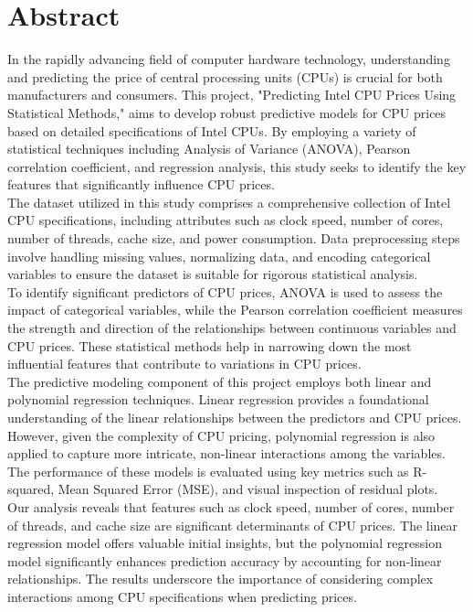 \section{Abstract}

In the rapidly advancing field of computer hardware technology, understanding and predicting the price of central processing units (CPUs) is crucial for both manufacturers and consumers. This project, "Predicting Intel CPU Prices Using Statistical Methods," aims to develop robust predictive models for CPU prices based on detailed specifications of Intel CPUs. By employing a variety of statistical techniques including Analysis of Variance (ANOVA), Pearson correlation coefficient, and regression analysis, this study seeks to identify the key features that significantly influence CPU prices.\\

The dataset utilized in this study comprises a comprehensive collection of Intel CPU specifications, including attributes such as clock speed, number of cores, number of threads, cache size, and power consumption. Data preprocessing steps involve handling missing values, normalizing data, and encoding categorical variables to ensure the dataset is suitable for rigorous statistical analysis.\\

To identify significant predictors of CPU prices, ANOVA is used to assess the impact of categorical variables, while the Pearson correlation coefficient measures the strength and direction of the relationships between continuous variables and CPU prices. These statistical methods help in narrowing down the most influential features that contribute to variations in CPU prices.\\

The predictive modeling component of this project employs both linear and polynomial regression techniques. Linear regression provides a foundational understanding of the linear relationships between the predictors and CPU prices. However, given the complexity of CPU pricing, polynomial regression is also applied to capture more intricate, non-linear interactions among the variables. The performance of these models is evaluated using key metrics such as R-squared, Mean Squared Error (MSE), and visual inspection of residual plots.\\

Our analysis reveals that features such as clock speed, number of cores, number of threads, and cache size are significant determinants of CPU prices. The linear regression model offers valuable initial insights, but the polynomial regression model significantly enhances prediction accuracy by accounting for non-linear relationships. The results underscore the importance of considering complex interactions among CPU specifications when predicting prices.\\

